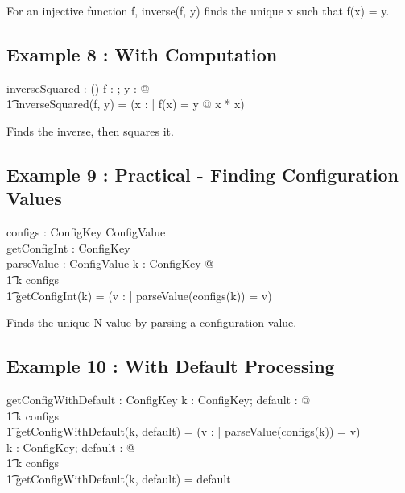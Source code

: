 \documentclass[a4paper,10pt,fleqn]{article}
\begin{document}
\noindent For an injective function f, inverse(f, y) finds the unique x such that f(x) = y.

\bigskip

\subsection*{Example 8 : With Computation}

\begin{axdef}
inverseSquared : (\nat \fun \nat) \cross \nat \fun \nat
\where
\forall f : \nat \fun \nat; y : \nat @ \\
\t1 inverseSquared(f, y) = (\mu x : \nat | f(x) = y @ x * x)
\end{axdef}

\noindent Finds the inverse, then squares it.

\bigskip

\subsection*{Example 9 : Practical - Finding Configuration Values}

\begin{zed}
\end{zed}

\begin{axdef}
configs : ConfigKey \pfun ConfigValue \\
getConfigInt : ConfigKey \fun \nat \\
parseValue : ConfigValue \fun \nat
\where
\forall k : ConfigKey @ \\
\t1 k \in \dom configs \implies \\
\t1 getConfigInt(k) = (\mu v : \nat | parseValue(configs(k)) = v)
\end{axdef}

\noindent Finds the unique N value by parsing a configuration value.

\bigskip

\subsection*{Example 10 : With Default Processing}

\begin{axdef}
getConfigWithDefault : ConfigKey \cross \nat \fun \nat
\where
\forall k : ConfigKey; default : \nat @ \\
\t1 k \in \dom configs \implies \\
\t1 getConfigWithDefault(k, default) = (\mu v : \nat | parseValue(configs(k)) = v) \\
\forall k : ConfigKey; default : \nat @ \\
\t1 k \notin \dom configs \implies \\
\t1 getConfigWithDefault(k, default) = default
\end{axdef}
\end{document}
